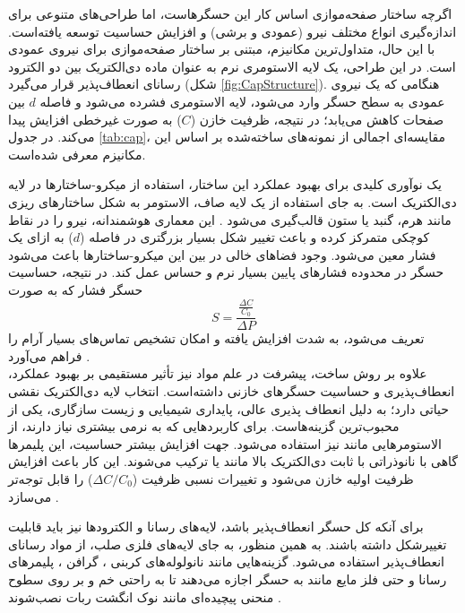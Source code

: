 اگرچه ساختار صفحه‌موازی اساس کار این حسگرهاست، اما طراحی‌های متنوعی برای اندازه‌گیری انواع مختلف نیرو (عمودی و برشی) و افزایش حساسیت توسعه یافته‌است. با این حال، متداول‌ترین مکانیزم، مبتنی بر ساختار صفحه‌موازی برای نیروی عمودی است. در این طراحی، یک لایه الاستومری نرم به عنوان ماده دی‌الکتریک بین دو الکترود رسانای انعطاف‌پذیر قرار می‌گیرد (شکل \ref{fig:CapStructure}). هنگامی که یک نیروی عمودی به سطح حسگر وارد می‌شود، لایه الاستومری فشرده می‌شود و فاصله $d$ بین صفحات کاهش می‌یابد؛ در نتیجه، ظرفیت خازن ($C$) به صورت غیرخطی افزایش پیدا می‌کند. در جدول \ref{tab:cap}، مقایسه‌ای اجمالی از نمونه‌های ساخته‌شده بر اساس این مکانیزم معرفی شده‌است.

یک نوآوری کلیدی برای بهبود عملکرد این ساختار، استفاده از میکرو-ساختارها
 در لایه دی‌الکتریک است. به جای استفاده از یک لایه صاف، الاستومر به شکل ساختارهای ریزی مانند هرم، گنبد یا ستون
   قالب‌گیری می‌شود \cite{mannsfeld2010highly}. این معماری هوشمندانه، نیرو را در نقاط کوچکی متمرکز کرده و باعث تغییر شکل بسیار بزرگتری در فاصله ($d$) به ازای یک فشار معین می‌شود. وجود فضاهای خالی در بین این میکرو-ساختارها باعث می‌شود حسگر در محدوده فشارهای پایین بسیار نرم و حساس عمل کند. در نتیجه، حساسیت حسگر فشار که به صورت
$$
  	S = \frac{\frac{\Delta C}{C_0}}{\Delta P}
$$
     تعریف می‌شود، به شدت افزایش یافته و امکان تشخیص تماس‌های بسیار آرام را فراهم می‌آورد \cite{zou2017novel}.
\\
علاوه بر روش ساخت، پیشرفت در علم مواد نیز تأثیر مستقیمی بر بهبود عملکرد، انعطاف‌پذیری و حساسیت حسگرهای خازنی داشته‌است. انتخاب لایه دی‌الکتریک نقشی حیاتی دارد؛ 
 به دلیل انعطاف ‌پذیری عالی، پایداری شیمیایی و زیست ‌سازگاری، یکی از محبوب‌ترین گزینه‌هاست. برای کاربردهایی که به نرمی بیشتری نیاز دارند، از الاستومرهایی مانند
   نیز استفاده می‌شود. جهت افزایش بیشتر حساسیت، این پلیمرها گاهی با نانوذراتی با ثابت دی‌الکتریک بالا
  مانند
   
    یا 
       
     ترکیب می‌شوند. این کار باعث افزایش ظرفیت اولیه خازن می‌شود و تغییرات نسبی ظرفیت ($\Delta C/C_0$) را قابل توجه‌تر می‌سازد \cite{zou2017novel}.
     
برای آنکه کل حسگر انعطاف‌پذیر باشد، لایه‌های رسانا و الکترودها نیز باید قابلیت تغییرشکل داشته باشند. به همین منظور، به جای لایه‌های فلزی صلب، از مواد رسانای انعطاف‌پذیر استفاده می‌شود. گزینه‌هایی مانند نانولوله‌های کربنی
، 
 گرافن
 ، 
 پلیمرهای رسانا و حتی  فلز مایع مانند 
  به حسگر اجازه می‌دهند تا به راحتی خم و بر روی سطوح منحنی پیچیده‌ای مانند نوک انگشت ربات نصب‌شوند \cite{chi2018recent}.


